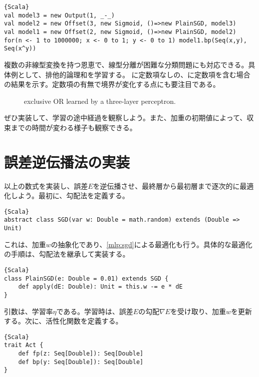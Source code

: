 \documentclass[10pt,a4paper]{book}
\begin{document}
\begin{Verbatim}{Scala}
val model3 = new Output(1, _-_)
val model2 = new Offset(3, new Sigmoid, ()=>new PlainSGD, model3)
val model1 = new Offset(2, new Sigmoid, ()=>new PlainSGD, model2)
for(n <- 1 to 1000000; x <- 0 to 1; y <- 0 to 1) model1.bp(Seq(x,y), Seq(x^y))
\end{Verbatim}

複数の非線型変換を持つ恩恵で、線型分離が困難な分類問題にも対応できる。具体例として、排他的論理和を学習する。
に定数項なしの、に定数項を含む場合の結果を示す。定数項の有無で境界が変化する点にも要注目である。

\begin{figure}[h]
\centering
{}
\caption{exclusive OR learned by a three-layer perceptron.\label{fig:mlp.split}}
\end{figure}

ぜひ実装して、学習の途中経過を観察しよう。また、加重の初期値によって、収束までの時間が変わる様子も観察できる。

\section{誤差逆伝播法の実装\label{sect:chain}}

以上の数式を実装し、誤差$E$を逆伝播させ、最終層から最初層まで逐次的に最適化しよう。最初に、勾配法を定義する。

\begin{Verbatim}{Scala}
abstract class SGD(var w: Double = math.random) extends (Double => Unit)
\end{Verbatim}

これは、加重$w$の抽象化であり、\eqref{mlp:sgd}による最適化も行う。具体的な最適化の手順は、勾配法を継承して実装する。

\begin{Verbatim}{Scala}
class PlainSGD(e: Double = 0.01) extends SGD {
	def apply(dE: Double): Unit = this.w -= e * dE
}
\end{Verbatim}

引数は、学習率$\eta$である。学習時は、誤差$E$の勾配$\nabla E$を受け取り、加重$w$を更新する。次に、活性化関数を定義する。

\begin{Verbatim}{Scala}
trait Act {
	def fp(z: Seq[Double]): Seq[Double]
	def bp(y: Seq[Double]): Seq[Double]
}
\end{Verbatim}
\end{document}
